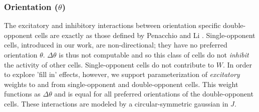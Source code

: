 \documentclass[journal,onecolumn]{IEEEtran}
\begin{document}
\subsubsection*{Orientation ($\theta$)}
The excitatory and inhibitory interactions between orientation specific double-opponent cells are exactly as those defined by Penacchio \cite{penacchio:2013} and Li \cite{li:1999}. Single-opponent cells, introduced in our work, are non-directional; they have no preferred orientation $\theta$. $\Delta\theta$ is thus not computable and so this class of cells do not \textit{inhibit} the activity of other cells. Single-opponent cells do not contribute to $W$. In order to explore 'fill in' effects, however, we support parameterization of \textit{excitatory} weights to and from single-opponent and double-opponent cells. This weight functions as $\Delta\theta$ and is equal for all preferred orientations of the double-opponent cells. These interactions are modeled by a circular-symmetric gaussian in $J$. 
\end{document}
